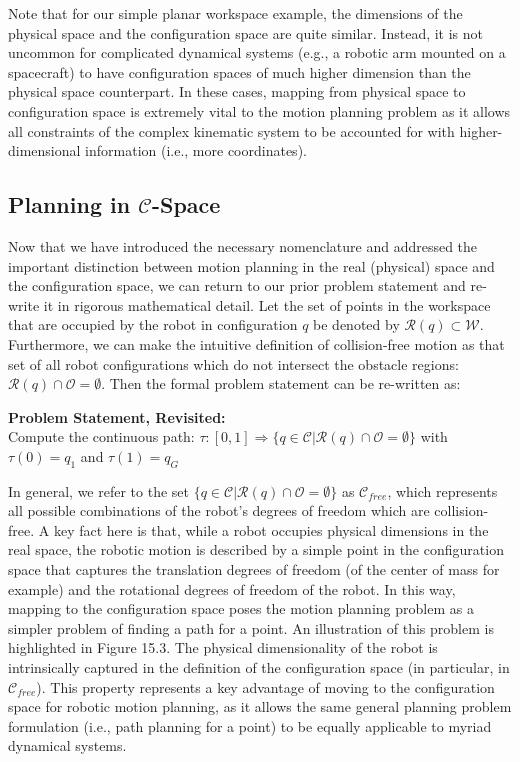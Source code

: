 \documentclass[twoside]{article}
\begin{document}
Note that for our simple planar workspace example, the dimensions of the physical space and the configuration space are quite similar. Instead, it is not uncommon for complicated dynamical systems (e.g., a robotic arm mounted on a spacecraft) to have configuration spaces of much higher dimension than the physical space counterpart. In these cases, mapping from physical space to configuration space is extremely
vital to the motion planning problem as it allows all constraints of the complex kinematic system to be accounted for with higher-dimensional information (i.e., more coordinates).

\subsection{ Planning in $\mathcal{C}$-Space }
Now that we have introduced the necessary nomenclature and addressed the important distinction between motion planning in the real (physical) space and the configuration space, we can return to our prior problem statement and re-write it in rigorous mathematical detail. Let the set of points in the workspace that are occupied by the robot in configuration $q$ be denoted by $\mathcal{R}(q) \subset \mathcal{W}$. Furthermore, we can make the intuitive definition of collision-free motion as that set of all robot configurations which do not intersect the obstacle regions: $\mathcal{R}(q)\cap \mathcal{O} = \emptyset$. Then the formal problem statement can be re-written as: 

\textbf{Problem Statement, Revisited:} \\
Compute the continuous path: $\tau : [0, 1]  \Rightarrow \{q \in \mathcal{C}|\mathcal{R}(q) \cap \mathcal{O} = \emptyset\}$ with $\tau(0) = q_1$ and $\tau(1) = q_G$

 In general, we refer to the set $\{q \in \mathcal{C} | \mathcal{R}(q) \cap \mathcal{O} = \emptyset\}$ as $\mathcal{C}_{free}$, which represents all possible combinations of the robot’s degrees of freedom which are collision-free. A key fact here is that, while a robot occupies physical dimensions in the real space, the robotic motion is described by a simple point in the configuration space that captures the translation degrees of freedom (of the center of mass for example) and the rotational degrees of freedom of the robot. In this way, mapping to the configuration space poses the motion planning problem as a simpler problem of finding a path for a point. An illustration of this problem is highlighted in Figure 15.3. The physical dimensionality of the robot is intrinsically captured in the definition of the configuration space (in particular, in $\mathcal{C}_{free}$). This property represents a key advantage of moving to the configuration space for robotic motion planning, as it allows the same general planning problem formulation (i.e., path planning for a point) to be equally applicable to myriad dynamical systems.
\end{document}
